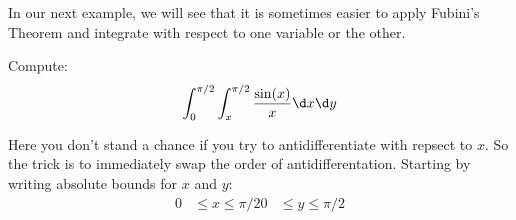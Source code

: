 \documentclass{ximera}
\begin{document}
In our next example, we will see that it is sometimes easier to apply
Fubini's Theorem and integrate with respect to one variable or the
other.

\begin{example}
  Compute:
  \[
  \int_0^{\pi/2}\int_x^{\pi/2} \frac{\sin(x)}{x} \d x \d y
  \]
  \begin{example}
    Here you don't stand a chance if you try to antidifferentiate with
    repsect to $x$. So the trick is to immediately swap the order of
    antidifferentation. Starting by writing absolute bounds for $x$ and $y$:
    \begin{align*}
    0 &\le x \le \pi/2
    0 &\le y \le \pi/2
    \end{align*}
    
  \end{example}
\end{example}
\end{document}
